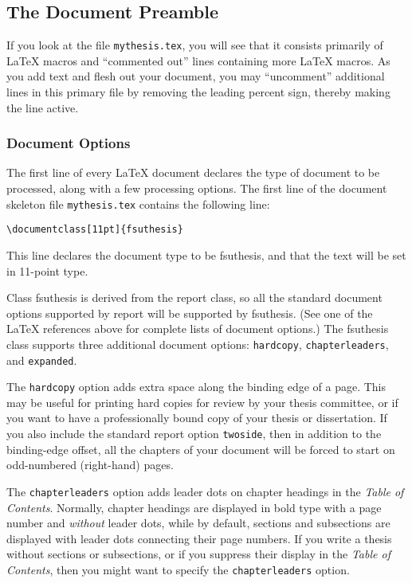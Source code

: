 \documentclass[11pt,letterpaper]{article}
\newcommand*{\complit}[1]{\texttt{#1}}
\newcommand*{\latexclass}[1]{\textsf{#1}}
\newcommand*{\fsuth}{\latexclass{fsuthesis}}
\renewcommand{\-}{\discretionary{}{}{}}
\begin{document}
\subsection{The Document Preamble}

If you look at the file \complit{mythesis.tex}, you will see that it
consists primarily of \LaTeX{} macros and ``commented out'' lines
containing more \LaTeX{} macros.  As you add text and flesh out your
document, you may ``uncomment'' additional lines in this primary file
by removing the leading percent sign, thereby making the line active.

\subsubsection{Document Options}
The first line of every \LaTeX{} document declares the type of
document to be processed, along with a few processing options.  The
first line of the document skeleton file \complit{mythesis.tex}
contains the following line:
\begin{verbatim}
\documentclass[11pt]{fsuthesis}
\end{verbatim}
This line declares the document type to be \fsuth, and that the text
will be set in 11-point type.

Class \fsuth{} is derived from the \latexclass{report} class, so all
the standard document options supported by \latexclass{report} will be
supported by \fsuth.  (See one of the \LaTeX{} references above for
complete lists of document options.)  The \fsuth{} class supports
three additional document options: \complit{hardcopy},
\complit{chapterleaders}, and \complit{expanded}.

The \complit{hardcopy} option adds extra space along the binding edge
of a page.  This may be useful for printing hard copies for review by
your thesis committee, or if you want to have a professionally bound
copy of your thesis or dissertation.  If you also include the standard
\latexclass{report} option \complit{twoside}, then in addition to the
binding-edge offset, all the chapters of your document will be forced
to start on odd-numbered (right-hand) pages.

The \complit{chapterleaders} option adds leader dots on chapter
headings in the \textsl{Table of Contents}.  Normally, chapter
headings are displayed in bold type with a page number and
\emph{without} leader dots, while by default, sections and subsections
are displayed with leader dots connecting their page numbers.  If you
write a thesis without sections or subsections, or if you suppress
their display in the \textsl{Table of Contents}, then you might want
to specify the \complit{chapterleaders} option.
\end{document}
